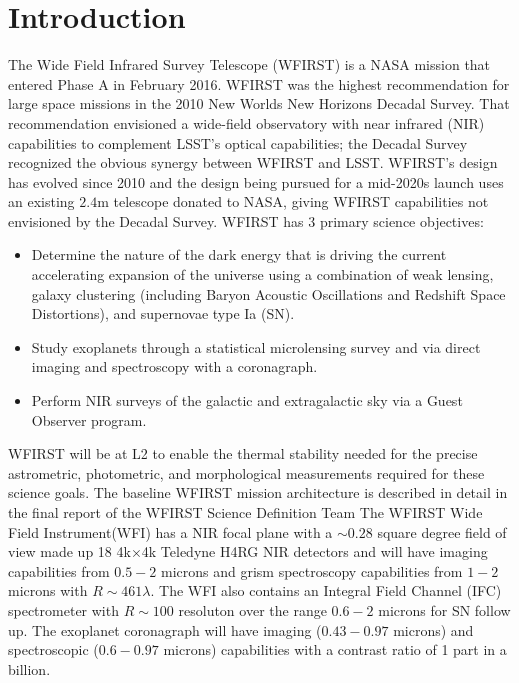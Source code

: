 
\section{Introduction}
\label{sec:wfirst:intro}


The Wide Field Infrared Survey Telescope (WFIRST) is a NASA mission that
entered Phase A in February 2016.  WFIRST was the highest recommendation
for large space missions in the 2010 New Worlds New Horizons Decadal
Survey.  That recommendation envisioned a wide-field observatory with
near infrared (NIR) capabilities to complement LSST's optical
capabilities; the Decadal Survey recognized the obvious synergy between
WFIRST and LSST.  WFIRST's design has evolved since 2010 and the design
being pursued for a mid-2020s launch uses an existing $2.4$m telescope
donated to NASA, giving WFIRST capabilities not envisioned by the
Decadal Survey.  WFIRST has 3 primary science objectives:

\begin{itemize}
\item Determine the nature of the dark energy that is driving the
current accelerating expansion of the universe using a combination of
weak lensing, galaxy clustering (including Baryon Acoustic Oscillations
and Redshift Space Distortions), and supernovae type Ia (SN).
\item Study exoplanets through a statistical microlensing survey and via
direct imaging and spectroscopy with a coronagraph.
\item Perform NIR surveys of the galactic and extragalactic sky via a
Guest Observer program.
\end{itemize}

WFIRST will be at L2 to enable the thermal stability needed for the
precise astrometric, photometric, and morphological measurements
required for these science goals. The baseline WFIRST mission
architecture is described in detail in the final report of the WFIRST
Science Definition Team \citep{2015arXiv150303757S} 
The WFIRST Wide Field
Instrument(WFI) has a NIR focal plane with a $\sim0.28$ square degree
field of view made up 18 4k$\times$4k Teledyne H4RG NIR detectors and will
have imaging capabilities from $0.5-2$ microns and grism spectroscopy
capabilities from $1-2$ microns with $R\sim461\lambda$.  The WFI
also contains an Integral Field Channel (IFC) spectrometer with $R\sim100$
resoluton over the range $0.6-2$ microns for SN follow up. The exoplanet
coronagraph will have imaging ($0.43-0.97$ microns) and spectroscopic
($0.6-0.97 $ microns) capabilities with a contrast ratio of 1 part in a
billion.

